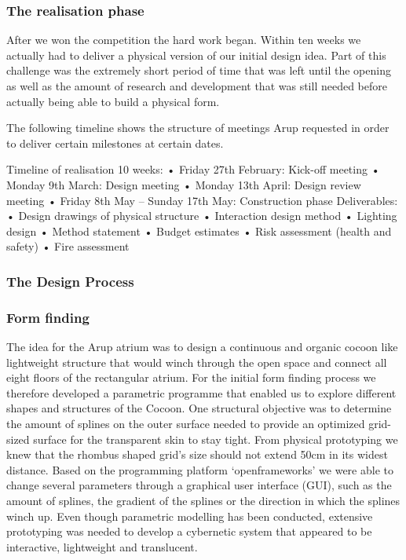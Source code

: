 \subsubsection{The realisation phase}

After we won the competition the hard work began. Within ten weeks we actually had to deliver a physical version of our initial design idea. Part of this challenge was the extremely short period of time that was left until the opening as well as the amount of research and development that was still needed before actually being able to build a physical form. 

The following timeline shows the structure of meetings Arup requested in order to deliver certain milestones at certain dates.

Timeline of realisation 10 weeks:
•	Friday 27th February: Kick-off meeting
•	Monday 9th March: Design meeting
•	Monday 13th April: Design review meeting
•	Friday 8th May – Sunday 17th May: Construction phase
Deliverables:
•	Design drawings of physical structure
•	Interaction design method
•	Lighting design 
•	Method statement
•	Budget estimates
•	Risk assessment (health and safety) 
•	Fire assessment

\subsubsection{The Design Process}

\subsubsection*{Form finding}

The idea for the Arup atrium was to design a continuous and organic cocoon like lightweight structure that would winch through the open space and connect all eight floors of the rectangular atrium.
For the initial form finding process we therefore developed a parametric programme that enabled us to explore different shapes and structures of the Cocoon. One structural objective was to determine the amount of splines on the outer surface needed to provide an optimized grid-sized surface for the transparent skin to stay tight. From physical prototyping we knew that the rhombus shaped grid’s size should not extend 50cm in its widest distance.
Based on the programming platform ‘openframeworks’  we were able to change several parameters through a graphical user interface (GUI), such as the amount of splines, the gradient of the splines or the direction in which the splines winch up. Even though parametric modelling has been conducted, extensive prototyping was needed to develop a cybernetic system that appeared to be interactive, lightweight and translucent.

